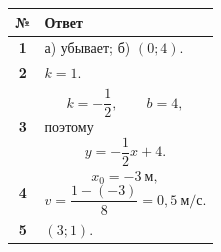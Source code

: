 \documentclass[a4paper,12pt]{article}
\begin{document}
\begin{table}[h]

\centering

\begin{tabularx}{\linewidth}{
    @{}
    >{\bfseries}c
    X
    @{}
}

\toprule

№ & Ответ \\

\midrule

1 &
а) убывает;
б) $(0;4)$.
\\

2 &
$k=1$.
\\

3 &
\[
    k=-\frac12,
    \qquad
    b=4,
\]
поэтому
\[
    y=-\frac12x+4.
\]
\\

4 &
\[
    x_0=-3\ \text{м},
\]
\[
    v=
    \frac{1-(-3)}{8}
    =
    0{,}5\ \text{м/с}.
\]
\\

5 &
$(3;1)$.
\\

\bottomrule

\end{tabularx}

\end{table}
\end{document}
